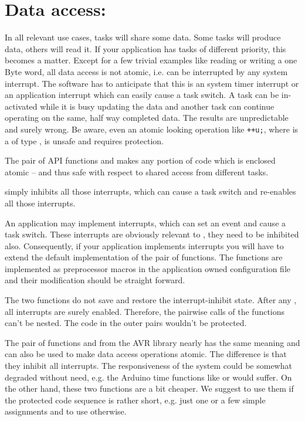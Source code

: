 \section{Data access: }
\label{secEnterLeaveCritSec}

In all relevant use cases, tasks will share some data. Some tasks will
produce data, others will read it. If your application has tasks of
different priority, this becomes a matter. Except for a few trivial
examples like reading or writing a one Byte word, all data access is not
atomic, i.e. can be interrupted by any system interrupt. The software has
to anticipate that this is an \rtos{} system timer interrupt or an
application interrupt which can easily cause a task switch. A task can be
in-activated while it is busy updating the data and another task can
continue operating on the same, half way completed data. The results are
unpredictable and surely wrong. Be aware, even an atomic looking operation
like \verb$++u;$, where  is a of type , is unsafe
and requires protection.

The pair of API functions  and
 makes any portion of code which is
enclosed atomic -- and thus safe with respect to shared access from
different tasks.

 simply inhibits all those interrupts,
which can cause a task switch and 
re-enables all those interrupts.

An application may implement interrupts, which can set an \rtos{} event
and cause a task switch. These interrupts are obviously relevant to
, they need to be inhibited also.
Consequently, if your application implements interrupts you will have to
extend the default implementation of the pair of functions. The functions
are implemented as preprocessor macros in the application owned \rtos{}
configuration file  and their modification should be
straight forward.

The two functions do not save and restore the interrupt-inhibit state.
After any , all interrupts are surely
enabled. Therefore, the pairwise calls of the functions can't be nested.
The code in the outer pairs wouldn't be protected.

The pair of functions  and  from the AVR library
nearly has the same meaning and can also be used to make data access
operations atomic. The difference is that they inhibit all interrupts. The
responsiveness of the system could be somewhat degraded without need, e.g.
the Arduino time functions like  or  would
suffer. On the other hand, these two functions are a bit cheaper. We
suggest to use them if the protected code sequence is rather short, e.g.
just one or a few simple assignments and to use
 otherwise.

